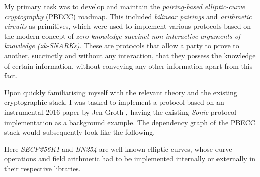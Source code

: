 \documentclass[11pt]{article}
\begin{document}
My primary task was to develop and maintain the \emph{pairing-based elliptic-curve cryptography} (PBECC) roadmap. This included \emph{bilinear pairings} and \emph{arithmetic circuits} as primitives, which were used to implement various protocols based on the modern concept of \emph{zero-knowledge succinct non-interactive arguments of knowledge (zk-SNARKs)}. These are protocols that allow a party to prove to another, succinctly and without any interaction, that they possess the knowledge of certain information, without conveying any other information apart from this fact.

Upon quickly familiarising myself with the relevant theory and the existing cryptographic stack, I was tasked to implement a protocol based on an instrumental 2016 paper by Jen Groth \cite{groth}, having the existing \emph{Sonic} protocol \cite{sonic} implementation as a background example. The dependency graph of the PBECC stack would subsequently look like the following.
\begin{center}
\end{center}
Here \emph{SECP256K1} and \emph{BN254} are well-known elliptic curves, whose curve operations and field arithmetic had to be implemented internally or externally in their respective libraries.
\end{document}
